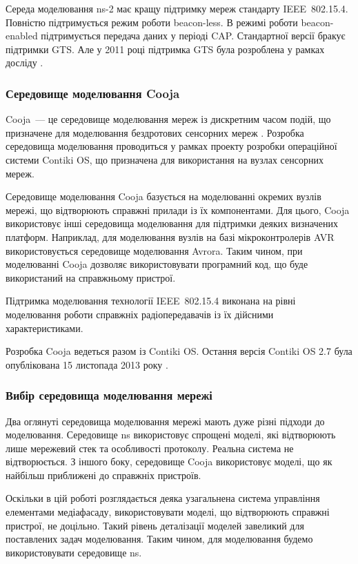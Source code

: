 \documentclass[a4paper,ukrainian,utf8,nocolumnsxix,floatsection,equationsection]{eskdtext}
\renewcommand\paragraph{\subsubsection}
\newcommand{\iee}[0]{IEEE~802.15.4\xspace}
\newcommand{\blm}[0]{beacon-less\xspace}
\newcommand{\bem}[0]{beacon-enabled\xspace}
\begin{document}
Середа моделювання ns-2 має кращу підтримку мереж стандарту \iee. Повністю підтримується режим роботи \blm. В режимі роботи \bem підтримується передача даних у періоді CAP. Стандартної версії бракує підтримки GTS. Але у 2011 році підтримка GTS була розроблена у рамках досліду \cite{ns2:with:cfp}.

\paragraph{Середовище моделювання Cooja}

Cooja~--- це середовище моделювання мереж із дискретним часом подій, що призначене для моделювання бездротових сенсорних мереж \cite{cooja:intro}. Розробка середовища моделювання проводиться у рамках проекту розробки операційної системи Contiki OS, що призначена для використання на вузлах сенсорних мереж. 

Середовище моделювання Cooja базується на моделюванні окремих вузлів мережі, що відтворюють справжні прилади із їх компонентами. Для цього, Cooja використовує інші середовища моделювання для підтримки деяких визначених платформ. Наприклад, для моделювання вузлів на базі мікроконтролерів AVR використовується середовище моделювання Avrora. Таким чином, при моделюванні Cooja дозволяє використовувати програмний код, що буде використаний на справжньому пристрої.

Підтримка моделювання технології \iee виконана на рівні моделювання роботи справжніх радіопередавачів із їх дійсними характеристиками.

Розробка Cooja ведеться разом із Contiki OS. Остання версія Contiki OS 2.7 була опублікована 15 листопада 2013 року \cite{contikios:27:released}. 

\paragraph{Вибір середовища моделювання мережі}

Два оглянуті середовища моделювання мережі мають дуже різні підходи до моделювання. Середовище ns використовує спрощені моделі, які відтворюють лише мережевий стек та особливості протоколу. Реальна система не відтворюється. З іншого боку, середовище Cooja використовує моделі, що як найбільш приближені до справжніх пристроїв. 

Оскільки в цій роботі розглядається деяка узагальнена система управління елементами медіафасаду, використовувати моделі, що відтворюють справжні пристрої, не доцільно. Такий рівень деталізації моделей завеликий для поставлених задач моделювання. Таким чином, для моделювання будемо використовувати середовище ns.
\end{document}
